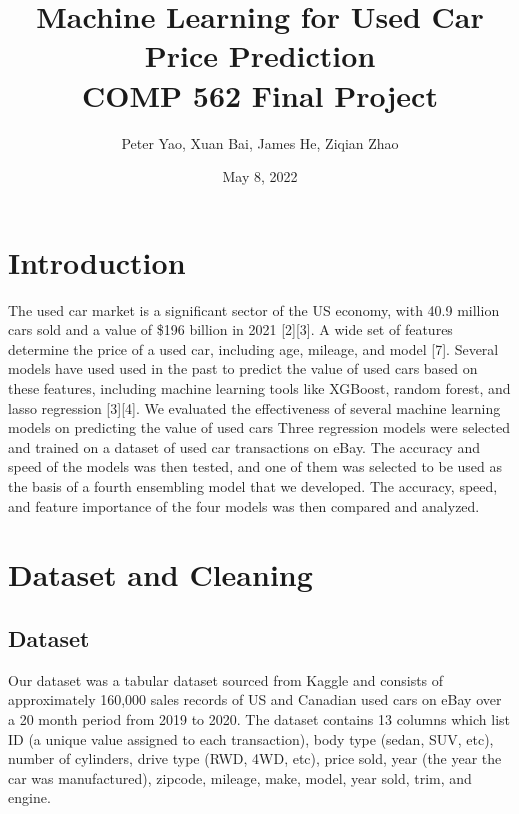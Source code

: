\documentclass[UTF8]{ctexart}
\date{May 8, 2022} %
\begin{document}
    \title{%
    Machine Learning for Used Car Price Prediction \\
    \large COMP 562 Final Project}

    \author{Peter Yao, Xuan Bai, James He, Ziqian Zhao}

    \maketitle
    
    \section{Introduction} %
    The used car market is a significant sector of the US economy, 
    with 40.9 million cars sold and a value of \$196 billion in 2021 [2][3]. 
    A wide set of features determine the price of a used car, including age, mileage, and model [7].
    Several models have used used in the past to predict the value of used cars based on these features, 
    including machine learning tools like XGBoost, random forest, and lasso regression [3][4]. 
    We evaluated the effectiveness of several machine learning models on predicting the value of used cars
    Three regression models were selected and trained on a dataset of used car transactions on eBay. 
    The accuracy and speed of the models was then tested, and one of them was selected to be
    used as the basis of a fourth ensembling model that we developed. 
    The accuracy, speed, and feature importance of the four models was then compared and analyzed.
        \newline

    \section{Dataset and Cleaning}
        \subsection{Dataset}
        Our dataset was a tabular dataset sourced from Kaggle and consists of approximately 160,000 sales 
        records of US and Canadian used cars on eBay over a 20 month period from 2019 to 2020. The dataset 
        contains 13 columns which list ID (a unique value assigned to each transaction), body type (sedan, SUV, etc), 
        number of cylinders, drive type (RWD, 4WD, etc), price sold, year (the year the car was manufactured), zipcode, mileage, make, model, 
        year sold, trim, and engine. \newline
\end{document}
